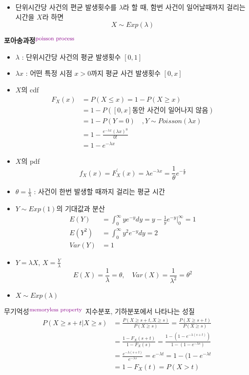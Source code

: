 \documentclass{oblivoir}
\newcommand{\DC}[1]{\textcolor{DarkMagenta}{#1}}%
\newcommand{\UP}[1]{$^{\mbox{\DC{\footnotesize #1}}}$}
\begin{document}
\begin{itemize}
\item 단위시간당 사건의 편균 발생횟수를 $\lambda$라 할 때, 함번 사건이 일어날때까지 걸리는 시간을 $X$라 하면
$$
X \sim Exp(\lambda)
$$
\end{itemize}
\textbf{포아송과정\UP{poisson process}}
\begin{itemize}
\item $\lambda$ : 단위시간당 사건의 평균 발생횟수 $[0,1]$
\item $\lambda x$ : 어떤 특정 시점 $x > 0$까지 평균 사건 발생횟수 $[0,x]$
\item $X$의 cdf
\begin{align*}
F_X(x) &= P(X \leq x) = 1 - P(X \geq x) \\
&= 1 - P([0,x] \mbox{동안 사건이 일어나지 않음})\\
&= 1 - P(Y = 0) \quad, Y \sim Poisson(\lambda x) \\
&= 1 - \frac{e^{-\lambda x} (\lambda x )^0}{0!} \\
&= 1 - e^{- \lambda x}
\end{align*}
\item $X$의 pdf
$$
f_X(x) = F_X^{\prime}(x) = \lambda e^{- \lambda x} = \frac{1}{\theta} e^{- \frac{x}{\theta}}
$$
\item $\theta = \frac{1}{\lambda}$ : 사건이 한번 발생할 때까지 걸리는 평균 시간
\item $Y \sim Exp(1)$의 기대값과 분산
\begin{align*}
E(Y) &= \int_0^{\infty} y e^{-y} dy = y - \frac{1}{y} e^{-y} |_0^{\infty} = 1 \\
E(Y^2) &= \int_0^{\infty} y^2 e^{-y} dy = 2 \\
Var(Y) &= 1
\end{align*}
\item $Y = \lambda X$, $X = \frac{Y}{\lambda}$
$$
E(X) = \frac{1}{\lambda} = \theta, \quad Var(X) = \frac{1}{\lambda^2} = \theta^2
$$
\item $X \sim Exp(\lambda)$
\end{itemize}
\begin{myframe}{무기억성\UP{memoryless property}}
지수분포, 기하분포에서 나타나는 성질
\begin{align*}
P(X \geq s+t | X \geq s) &=\frac{P(X \geq s+t, X \geq s)}{P(X \geq s)} = \frac{P(X \geq s+t)}{P(X \geq s)} \\
&= \frac{1 - F_X(s+t)}{1 - F_X(s)} = \frac{1 - (1-e^{-\lambda (s+t)})}{1 - (1 - e^{-\lambda s})}\\
&= \frac{e^{-\lambda (s+t)}}{e^{-\lambda s}}  = e^{-\lambda t} = 1 - (1 - e^{-\lambda t} \\
&= 1 - F_X(t) = P(X > t)
\end{align*}
\end{myframe}
\end{document}
